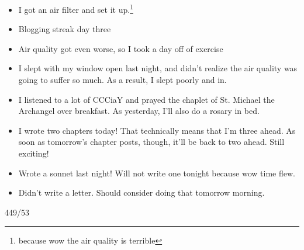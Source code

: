 \documentclass[12pt]{article}[titlepage]
\newcommand{\1}{\={a}}
\newcommand{\2}{\={e}}
\newcommand{\3}{\={\i}}
\newcommand{\4}{\=o}
\newcommand{\5}{\=u}
\newcommand{\6}{\={A}}
\renewcommand{\,}{\textsuperscript{,}}
\begin{document}
\begin{itemize}
\item I got an air filter and set it up.\footnote{because wow the air quality is terrible}
\item Blogging streak day three
\item Air quality got even worse, so I took a day off of exercise
\item I slept with my window open last night, and didn't realize the air quality was going to suffer so much. As a result, I slept poorly and in.
\item I listened to a lot of CCCiaY and prayed the chaplet of St. Michael the Archangel over breakfast. As yesterday, I'll also do a rosary in bed.
\item I wrote two chapters today! That technically means that I'm three ahead. As soon as tomorrow's chapter posts, though, it'll be back to two ahead. Still exciting!
\item Wrote a sonnet last night! Will not write one tonight because wow time flew.
\item Didn't write a letter. Should consider doing that tomorrow morning.
\end{itemize}

449/53
\end{document}

